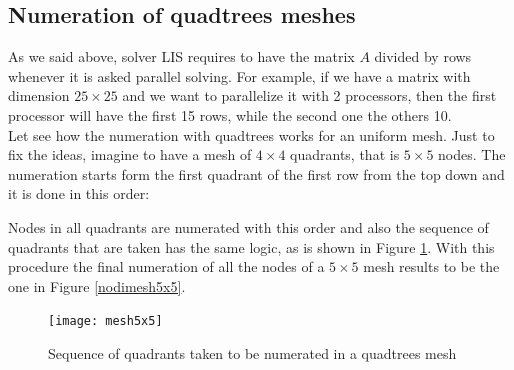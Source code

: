 \subsection{Numeration of quadtrees meshes}
As we said above, solver LIS requires to have the matrix $ A $ divided by rows whenever it is asked parallel solving. For example, if we have a matrix with dimension $ 25 \times 25 $ and we want to parallelize it with 2 processors, then the first processor will have the first 15 rows, while the second one the others 10. \\
Let see how the numeration with quadtrees works for an uniform mesh. Just to fix the ideas, imagine to have a mesh of $ 4 \times 4 $ quadrants, that is $ 5 \times 5 $ nodes. The numeration starts form the first quadrant of the first row from the top down and it is done in this order: \\
\begin{center}
\end{center}
Nodes in all quadrants are numerated with this order and also the sequence of quadrants that are taken has the same logic, as is shown in Figure \ref{mesh5x5}. With this procedure the final numeration of all the nodes of a $ 5 \times 5 $  mesh results to be the one in Figure \ref{nodimesh5x5}.
\begin{figure}[h]
	\centering
	\texttt{[image: mesh5x5]}
	\caption[Sequence of quadrants taken with quadtrees numetation for a mesh $ 5\times 5 $]{Sequence of quadrants taken to be numerated in a quadtrees mesh}
	\label{mesh5x5}
\end{figure}

